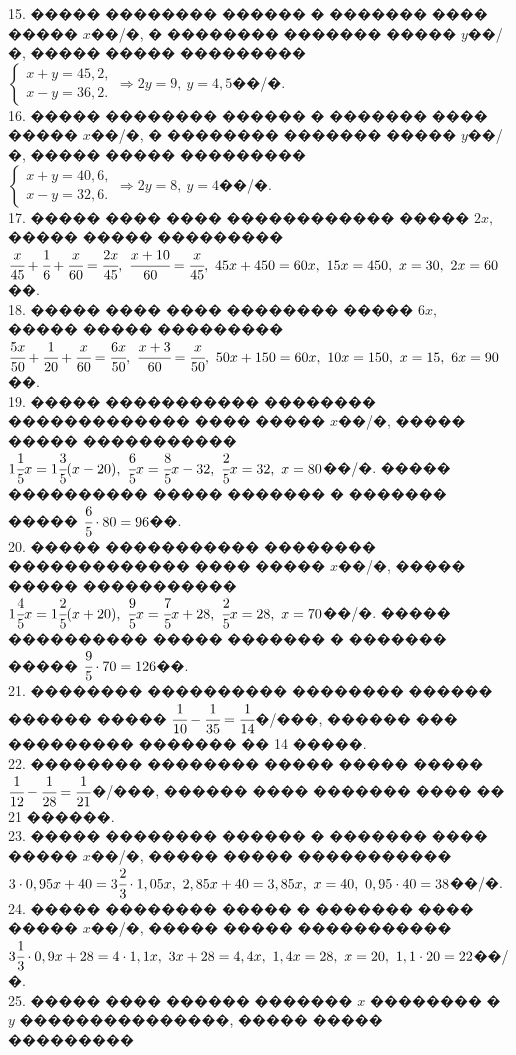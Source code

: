 \documentclass[12pt]{article}
\begin{document}
15. ����� �������� ������ � ������� ���� ����� $x$��/�, � �������� ������� ����� $y$��/�, ����� ����� ��������� $\begin{cases} x+y=45,2,\\ x-y=36,2.\end{cases}
\Rightarrow 2y=9,\ y=4,5$��/�.\\
16. ����� �������� ������ � ������� ���� ����� $x$��/�, � �������� ������� ����� $y$��/�, ����� ����� ��������� $\begin{cases} x+y=40,6,\\ x-y=32,6.\end{cases}
\Rightarrow 2y=8,\ y=4$��/�.\\
17. ����� ���� ���� ������������ ����� $2x,$ ����� ����� ��������� $\cfrac{x}{45}+\cfrac{1}{6}+\cfrac{x}{60}=\cfrac{2x}{45},\
\cfrac{x+10}{60}=\cfrac{x}{45},\ 45x+450=60x,\ 15x=450,\ x=30,\ 2x=60$��.\\
18. ����� ���� ���� �������� ����� $6x,$ ����� ����� ��������� $\cfrac{5x}{50}+\cfrac{1}{20}+\cfrac{x}{60}=\cfrac{6x}{50},\
\cfrac{x+3}{60}=\cfrac{x}{50},\ 50x+150=60x,\ 10x=150,\ x=15,\ 6x=90$��.\\
19. ����� ����������� �������� ������������� ���� ����� $x$��/�, ����� ����� ����������� $1\cfrac{1}{5}x=1\cfrac{3}{5}(x-20),\ \cfrac{6}{5}x=\cfrac{8}{5}x-32,\
\cfrac{2}{5}x=32,\ x=80$��/�. ����� ���������� ����� ������� � ������� ����� $\cfrac{6}{5}\cdot80=96$��.\\
20. ����� ����������� �������� ������������� ���� ����� $x$��/�, ����� ����� ����������� $1\cfrac{4}{5}x=1\cfrac{2}{5}(x+20),\ \cfrac{9}{5}x=\cfrac{7}{5}x+28,\
\cfrac{2}{5}x=28,\ x=70$��/�. ����� ���������� ����� ������� � ������� ����� $\cfrac{9}{5}\cdot70=126$��.\\
21. �������� ���������� �������� ������ ������ ����� $\cfrac{1}{10}-\cfrac{1}{35}=\cfrac{1}{14}$�/���, ������ ��� ��������� ������� �� 14 �����.\\
22. �������� �������� ����� ����� ����� $\cfrac{1}{12}-\cfrac{1}{28}=\cfrac{1}{21}$�/���, ������ ���� ������� ���� �� 21 ������.\\
23. ����� �������� ������ � ������� ���� ����� $x$��/�, ����� ����� ����������� $3\cdot0,95x+40=3\cfrac{2}{3}\cdot1,05x,\
2,85x+40=3,85x,\ x=40,\ 0,95\cdot40=38$��/�.\\
24. ����� �������� ����� � ������� ���� ����� $x$��/�, ����� ����� ����������� $3\cfrac{1}{3}\cdot0,9x+28=4\cdot1,1x,\
3x+28=4,4x,\ 1,4x=28,\ x=20,\ 1,1\cdot20=22$��/�.\\
25. ����� ���� ������ ������� $x$ �������� � $y$ ���������������, ����� ����� ���������\\
\end{document}
